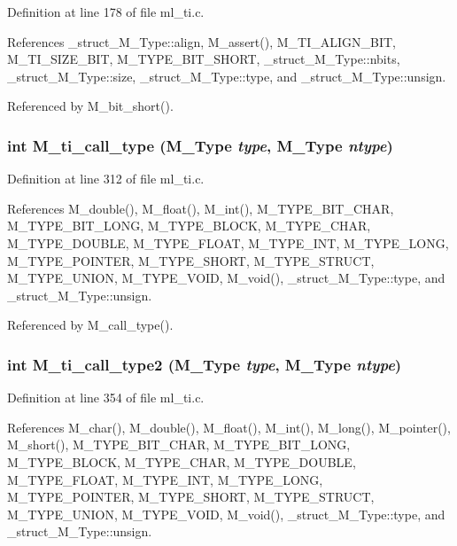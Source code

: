 Definition at line 178 of file ml\_\-ti.c.

References \_\-struct\_\-M\_\-Type::align, M\_\-assert(), M\_\-TI\_\-ALIGN\_\-BIT, M\_\-TI\_\-SIZE\_\-BIT, M\_\-TYPE\_\-BIT\_\-SHORT, \_\-struct\_\-M\_\-Type::nbits, \_\-struct\_\-M\_\-Type::size, \_\-struct\_\-M\_\-Type::type, and \_\-struct\_\-M\_\-Type::unsign.

Referenced by M\_\-bit\_\-short().
\subsubsection{\setlength{\rightskip}{0pt plus 5cm}int M\_\-ti\_\-call\_\-type (\bf{M\_\-Type} {\em type}, \bf{M\_\-Type} {\em ntype})}\label{m__ti_8h_152b2d6a90432c022324644c9c3b3fbb}




Definition at line 312 of file ml\_\-ti.c.

References M\_\-double(), M\_\-float(), M\_\-int(), M\_\-TYPE\_\-BIT\_\-CHAR, M\_\-TYPE\_\-BIT\_\-LONG, M\_\-TYPE\_\-BLOCK, M\_\-TYPE\_\-CHAR, M\_\-TYPE\_\-DOUBLE, M\_\-TYPE\_\-FLOAT, M\_\-TYPE\_\-INT, M\_\-TYPE\_\-LONG, M\_\-TYPE\_\-POINTER, M\_\-TYPE\_\-SHORT, M\_\-TYPE\_\-STRUCT, M\_\-TYPE\_\-UNION, M\_\-TYPE\_\-VOID, M\_\-void(), \_\-struct\_\-M\_\-Type::type, and \_\-struct\_\-M\_\-Type::unsign.

Referenced by M\_\-call\_\-type().
\subsubsection{\setlength{\rightskip}{0pt plus 5cm}int M\_\-ti\_\-call\_\-type2 (\bf{M\_\-Type} {\em type}, \bf{M\_\-Type} {\em ntype})}\label{m__ti_8h_8c6df6f3f3e5260cd76d9bb7cf952457}




Definition at line 354 of file ml\_\-ti.c.

References M\_\-char(), M\_\-double(), M\_\-float(), M\_\-int(), M\_\-long(), M\_\-pointer(), M\_\-short(), M\_\-TYPE\_\-BIT\_\-CHAR, M\_\-TYPE\_\-BIT\_\-LONG, M\_\-TYPE\_\-BLOCK, M\_\-TYPE\_\-CHAR, M\_\-TYPE\_\-DOUBLE, M\_\-TYPE\_\-FLOAT, M\_\-TYPE\_\-INT, M\_\-TYPE\_\-LONG, M\_\-TYPE\_\-POINTER, M\_\-TYPE\_\-SHORT, M\_\-TYPE\_\-STRUCT, M\_\-TYPE\_\-UNION, M\_\-TYPE\_\-VOID, M\_\-void(), \_\-struct\_\-M\_\-Type::type, and \_\-struct\_\-M\_\-Type::unsign.

